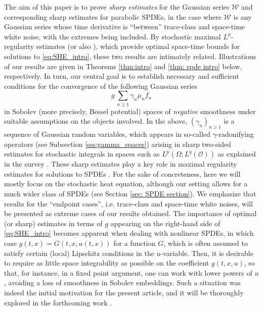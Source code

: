 \documentclass[reqno]{amsart}
\theoremstyle{plain}
\theoremstyle{remark}
\theoremstyle{plain}
\numberwithin{equation}{section}
\newcommand\cO{\mathcal{O}}
\newcommand\cW{\mathcal{W}}
\newcommand{\g}{\gamma}
\newcommand{\W}{\mathcal{W}}
\newcommand{\1}{\one}
\begin{document}
The aim of this paper is to prove \emph{sharp estimates} for the Gaussian series $\cW$ and corresponding sharp estimates for parabolic SPDEs, in the case where $\W$  is any Gaussian series whose time derivative is ``between'' trace-class and space-time white noise, with the extremes being included. 
By stochastic maximal $L^p$-regularity estimates \cite{MaximalLpregularity} (or also \cite[Section 3]{AV25_survey}), which provide optimal space-time bounds for solutions to \eqref{eq:SHE_intro}, these two results are intimately related. 
Illustrations of our results are given in Theorems \ref{thm:intro} and \ref{thm: spde intro} below, respectively. 
In turn, our central goal is to establish necessary and sufficient conditions for the convergence of the following Gaussian series 
\begin{equation}
\label{eq:BM}
g\,\sum_{n\geq 1} \g_n \mu_n f_n
\end{equation}
in Sobolev (more precisely, Bessel potential) spaces of \emph{negative} smoothness under suitable assumptions on the objects involved. In the above, $(\gamma_n)_{n\geq 1}$ is a sequence of Gaussian random variables, which appears in so-called $\gamma$-radonifying operators (see Subsection \ref{sss:gamma_spaces}) arising in sharp two-sided estimates for stochastic integrals in spaces such as $L^p(\Omega;L^q(\cO))$ as explained in the survey \cite{NVW13}. These sharp estimates play a key role in maximal regularity estimates for solutions to SPDEs \cite{AV25_survey,MaximalLpregularity}.
For the sake of concreteness, here we will mostly focus on the stochastic heat equation, although our setting allows for a much wider class of SPDEs (see Section \ref{sec: SPDE section}).
We emphasize that results for the ``endpoint cases'', i.e. trace-class and space-time white noises, will be presented as extreme cases of our results obtained. 
The importance of optimal (or sharp) estimates in terms of $g$ appearing on the right-hand side of \eqref{eq:SHE_intro} becomes apparent when dealing with nonlinear SPDEs, in which case 
$
g(t,x) = G(t,x,u(t,x))
$
for a function $G$, which is often assumed to satisfy certain (local) Lipschitz conditions in the $u$-variable. Then, it is desirable to require as little space integrability as possible on the coefficient $g(t,x,u)$, so that, for instance, in a fixed point argument, one can work with lower powers of $u$, avoiding a loss of smoothness in Sobolev embeddings. Such a situation was indeed the initial motivation for the present article, and it will be thoroughly explored in the forthcoming work \cite{AGVlocal}.
\end{document}
